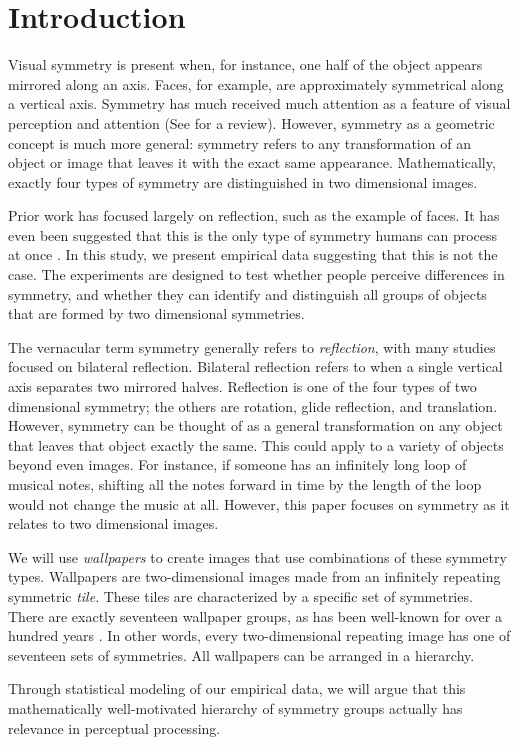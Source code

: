 \section{Introduction}
Visual symmetry is present when, for instance, one half of the object appears mirrored along an axis. Faces, for example, are approximately symmetrical along a vertical axis. Symmetry has much received much attention as a feature of visual perception and attention (See \cite{review} for a review). However, symmetry as a geometric concept is much more general: symmetry refers to any transformation of an object or image that leaves it with the exact same appearance. Mathematically, exactly four types of symmetry are distinguished in two dimensional images.

Prior work has focused largely on reflection, such as the example of faces. It has even been suggested that this is the only type of symmetry humans can process at once \citet{bio}. In this study, we present empirical data suggesting that this is not the case. The experiments are designed to test whether people perceive differences in symmetry, and whether they can identify and distinguish all groups of objects that are formed by two dimensional symmetries. 

The vernacular term symmetry generally refers to \emph{reflection}, with many studies focused on bilateral reflection. Bilateral reflection refers to when a single vertical axis separates two mirrored halves. Reflection is one of the four types of two dimensional symmetry; the others are rotation, glide reflection, and translation. However, symmetry can be thought of as a general transformation on any object that leaves that object exactly the same. This could apply to a variety of objects beyond even images. For instance, if someone has an infinitely long loop of musical notes, shifting all the notes forward in time by the length of the loop would not change the music at all. However, this paper focuses on symmetry as it relates to two dimensional images.

We will use \emph{wallpapers} to create images that use combinations of these symmetry types. Wallpapers are two-dimensional images made from an infinitely repeating symmetric \textit{tile}. These tiles are characterized by a specific set of symmetries. There are exactly seventeen wallpaper groups, as has been well-known for over a hundred years \citet{wallpaper-proof}. In other words, every two-dimensional repeating image has one of seventeen sets of symmetries. All wallpapers can be arranged in a hierarchy. 

Through statistical modeling of our empirical data, we will argue that this mathematically well-motivated hierarchy of symmetry groups actually has relevance in perceptual processing. 